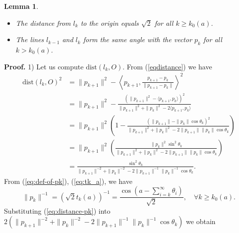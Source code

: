 \documentclass[12pt]{article}
\newtheorem{lemma}{Lemma}
\begin{document}
\begin{lemma}\label{lem:trajectory_property}
  \begin{itemize}
    \item[1)] The distance from $l_k$ to the origin equals $\sqrt{2}$ for all $k\geq k_0(a)$.
    \item[2)] The lines $l_{k-1}$ and $l_{k}$ form the same angle with the vector $p_{k}$ for all $k > k_0(a)$.
  \end{itemize}
\end{lemma}
\textbf{Proof.}
1)
Let us compute $\text{dist}(l_k, O)$. 
From (\ref{eqdistance}) we have 
$$
\begin{aligned}
\text{dist}(l_k, O)^2 
&= \|p_{k+1}\|^2 - \left\langle p_{k+1},  \frac{p_{k+1}-p_{k}}{\|p_{k+1}-p_{k}\|} \right \rangle^2\\
&= \|p_{k+1}\|^2 - 
\frac{
  \left(
  \|p_{k+1}\|^2 - \langle p_{k+1}, p_k \rangle
  \right)^2
  }
  {\|p_{k+1}\|^2 + \|p_k\|^2 - 2\langle p_{k+1}, p_k \rangle}\\
&= \|p_{k+1}\|^2
\left(1 - \frac{ \left(
  \|p_{k+1}\| - \| p_k\| \cos \theta_k 
  \right)^2}
  {\|p_{k+1}\|^2 + \| p_k\|^2 - 2\| p_{k+1}\| \|p_{k}\| \cos \theta_k}
\right)\\
&= \|p_{k+1}\|^2
\left( \frac{ 
   \| p_k\|^2 \sin^2 \theta_k 
  }
  {\|p_{k+1}\|^2 + \| p_k\|^2 - 2\| p_{k+1}\| \|p_{k}\| \cos \theta_k}
\right)\\
&= \frac{\sin^2 \theta_k }{\|p_{k+1}\|^{-2} + \| p_k\|^{-2} -2 \| p_{k+1}\|^{-1} \|p_{k}\|^{-1} \cos \theta_k}
.
\end{aligned}
$$
From (\ref{eq:def-of-pk}), (\ref{eq:tk_a}), we have 
\begin{equation}\label{eq:distance-pk}
  \|p_k\|^{-1}
  =\left(\sqrt{2} t_k(a)\right)^{-1}
  =
 \frac{\cos\left(a - \sum_{i=k}^\infty \theta_i\right)}{\sqrt{2}},
  \quad 
\forall k\geq k_0(a).
\end{equation}
Substituting (\ref{eq:distance-pk}) into $2\left(\|p_{k+1}\|^{-2} + \| p_k\|^{-2} -2 \| p_{k+1}\|^{-1} \|p_{k}\|^{-1} \cos \theta_k\right)$ we obtain
\end{document}
